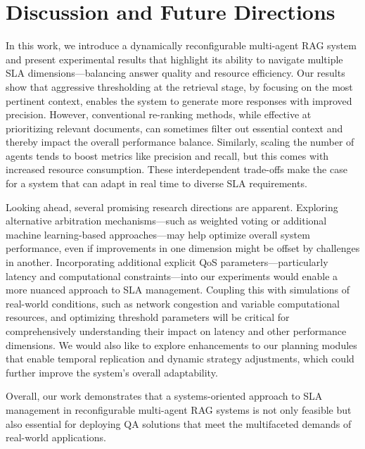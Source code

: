 \documentclass[sigconf,nonacm]{acmart}
\begin{document}
\section{Discussion and Future Directions}

In this work, we introduce a dynamically reconfigurable multi-agent RAG system and present experimental results that highlight its ability to navigate multiple SLA dimensions—balancing answer quality and resource efficiency. Our results show that aggressive thresholding at the retrieval stage, by focusing on the most pertinent context, enables the system to generate more responses with improved precision. However, conventional re-ranking methods, while effective at prioritizing relevant documents, can sometimes filter out essential context and thereby impact the overall performance balance. Similarly, scaling the number of agents tends to boost metrics like precision and recall, but this comes with increased resource consumption. These interdependent trade-offs make the case for a system that can adapt in real time to diverse SLA requirements.

Looking ahead, several promising research directions are apparent. Exploring alternative arbitration mechanisms—such as weighted voting or additional machine learning-based approaches—may help optimize overall system performance, even if improvements in one dimension might be offset by challenges in another. Incorporating additional explicit QoS parameters—particularly latency and computational constraints—into our experiments would enable a more nuanced approach to SLA management. Coupling this with simulations of real-world conditions, such as network congestion and variable computational resources, and optimizing threshold parameters will be critical for comprehensively understanding their impact on latency and other performance dimensions.  We would also like to explore enhancements to our planning modules that enable temporal replication and dynamic strategy adjustments, which could further improve the system's overall adaptability.

Overall, our work demonstrates that a systems-oriented approach to SLA management in reconfigurable multi-agent RAG systems is not only feasible but also essential for deploying QA solutions that meet the multifaceted demands of real-world applications.




\end{document}
